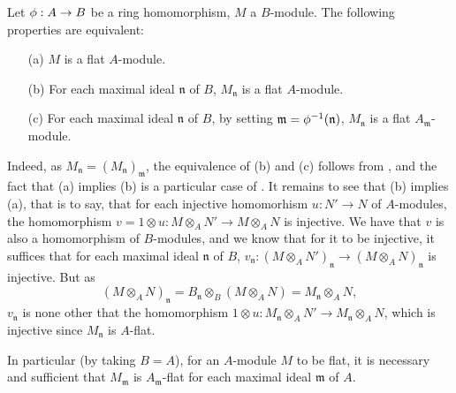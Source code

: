 \begin{env}[6.3.3]
\label{0.6.3.3}
Let $\vphi:A\to B$ be a ring homomorphism, $M$ a $B$-module. The following
properties are equivalent:
\begin{enumerate}
  \item[(a)] $M$ is a flat $A$-module.
  \item[(b)] For each maximal ideal $\mathfrak{n}$ of $B$, $M_\mathfrak{n}$ is a flat $A$-module.
  \item[(c)] For each maximal ideal $\mathfrak{n}$ of $B$, by setting
    $\mathfrak{m}=\phi^{-1}(\mathfrak{n})$, $M_\mathfrak{n}$ is a flat $A_\mathfrak{m}$-module.
\end{enumerate}

Indeed, as $M_\mathfrak{n}=(M_\mathfrak{n})_\mathfrak{m}$, the equivalence of
(b) and (c) follows from , and the fact that (a) implies (b) is
a particular case of . It remains to see that (b) implies (a),
that is to say, that for each injective homomorhism $u:N'\to N$ of $A$-modules, the
homomorphism $v=1\otimes u:M\otimes_A N'\to M\otimes_A N$ is injective. We have that $v$ is
also a homomorphism of $B$-modules, and we know that for it to be injective, it suffices that
for each maximal ideal $\mathfrak{n}$ of $B$,
$v_\mathfrak{n}:(M\otimes_A N')_\mathfrak{n}\to(M\otimes_A N)_\mathfrak{n}$ is injective. But
as
\[
  (M\otimes_A N)_\mathfrak{n}=B_\mathfrak{n}\otimes_B(M\otimes_A N)
  =M_\mathfrak{n}\otimes_A N,
\]
$v_\mathfrak{n}$ is none other that the homomorphism
$1\otimes u:M_\mathfrak{n}\otimes_A N'\to M_\mathfrak{n}\otimes_A N$, which is injective
since $M_\mathfrak{n}$ is $A$-flat.

In particular (by taking $B=A$), for an $A$-module $M$ to be flat, it is necessary and
sufficient that $M_\mathfrak{m}$ is $A_\mathfrak{m}$-flat for each maximal ideal
$\mathfrak{m}$ of $A$.
\end{env}

